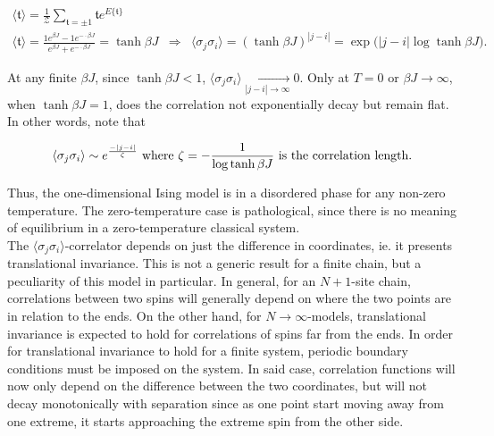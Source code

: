 \documentclass{homework}
\begin{document}
\begin{equation}
\begin{array}{ccc}
    \langle \mathfrak{t} \rangle = \frac{1}{\mathcal{Z}}\sum_{\mathfrak{t} =  \pm 1} \mathfrak{t} e^{E\{\mathfrak{t}\}}\\
     \langle \mathfrak{t} \rangle  = \frac{1 e^{\beta J} - 1 e^{-\cdot \beta J}}{e^{\beta J} +  e^{-\cdot \beta J}} = \tanh \beta J & \Rightarrow & \langle \sigma_j \sigma_i \rangle = (\tanh \beta J)^{|j-i|} = \exp \bigg(|j-i| \log \tanh \beta J\bigg).
\end{array}
\end{equation}

At any finite $\beta J$, since $\tanh \beta J < 1$, $\langle \sigma_j \sigma_i \rangle  \underset{|j-i| \rightarrow \infty}{\longrightarrow} 0$. Only at $T=0$ or $\beta J \rightarrow \infty$, when $\tanh \beta J = 1$, does the correlation not exponentially decay but remain flat. In other words, note that 

\begin{equation}
    \langle \sigma_j \sigma_i \rangle \sim e^{\frac{-|j-i|}{\zeta}} \textnormal{ where } \zeta = -\frac{1}{\log \tanh \beta J} \textnormal{ is the correlation length.}
\end{equation}

Thus, the one-dimensional Ising model is in a disordered phase for any non-zero temperature. The zero-temperature case is pathological, since there is no meaning of equilibrium in a zero-temperature classical system. 
\\

The $\langle \sigma_j \sigma_i \rangle$-correlator depends on just the difference in coordinates, ie. it presents translational invariance. This is not a generic result for a finite chain, but a peculiarity of this model in particular. In general, for an $N+1$-site chain, correlations between two spins will generally depend on where the two points are in relation to the ends. On the other hand, for $N\rightarrow\infty$-models, translational invariance is expected to hold for correlations of spins far from the ends. In order for translational invariance to hold for a finite system, periodic boundary conditions must be imposed on the system. In said case, correlation functions will now only depend on the difference between the two coordinates, but will not decay monotonically with separation since as one point start moving away from one extreme, it starts approaching the extreme spin from the other side. \\
\end{document}
